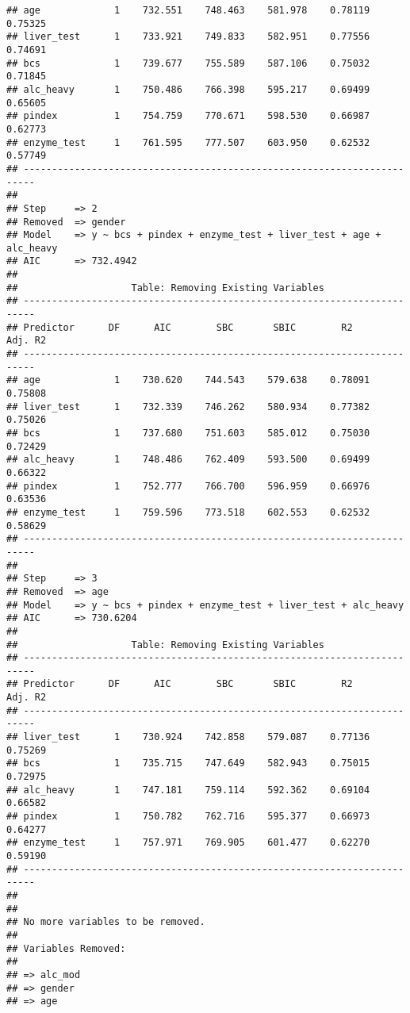 \documentclass[
]{article}
\begin{document}
\begin{verbatim}
## age             1    732.551    748.463    581.978    0.78119    0.75325 
## liver_test      1    733.921    749.833    582.951    0.77556    0.74691 
## bcs             1    739.677    755.589    587.106    0.75032    0.71845 
## alc_heavy       1    750.486    766.398    595.217    0.69499    0.65605 
## pindex          1    754.759    770.671    598.530    0.66987    0.62773 
## enzyme_test     1    761.595    777.507    603.950    0.62532    0.57749 
## ------------------------------------------------------------------------
## 
## Step     => 2 
## Removed  => gender 
## Model    => y ~ bcs + pindex + enzyme_test + liver_test + age + alc_heavy 
## AIC      => 732.4942 
## 
##                    Table: Removing Existing Variables                    
## ------------------------------------------------------------------------
## Predictor      DF      AIC        SBC       SBIC        R2       Adj. R2 
## ------------------------------------------------------------------------
## age             1    730.620    744.543    579.638    0.78091    0.75808 
## liver_test      1    732.339    746.262    580.934    0.77382    0.75026 
## bcs             1    737.680    751.603    585.012    0.75030    0.72429 
## alc_heavy       1    748.486    762.409    593.500    0.69499    0.66322 
## pindex          1    752.777    766.700    596.959    0.66976    0.63536 
## enzyme_test     1    759.596    773.518    602.553    0.62532    0.58629 
## ------------------------------------------------------------------------
## 
## Step     => 3 
## Removed  => age 
## Model    => y ~ bcs + pindex + enzyme_test + liver_test + alc_heavy 
## AIC      => 730.6204 
## 
##                    Table: Removing Existing Variables                    
## ------------------------------------------------------------------------
## Predictor      DF      AIC        SBC       SBIC        R2       Adj. R2 
## ------------------------------------------------------------------------
## liver_test      1    730.924    742.858    579.087    0.77136    0.75269 
## bcs             1    735.715    747.649    582.943    0.75015    0.72975 
## alc_heavy       1    747.181    759.114    592.362    0.69104    0.66582 
## pindex          1    750.782    762.716    595.377    0.66973    0.64277 
## enzyme_test     1    757.971    769.905    601.477    0.62270    0.59190 
## ------------------------------------------------------------------------
## 
## 
## No more variables to be removed.
## 
## Variables Removed: 
## 
## => alc_mod 
## => gender 
## => age
\end{verbatim}
\end{document}
